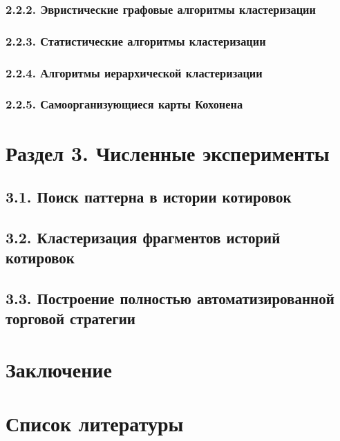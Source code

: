 \documentclass[12pt]{article}
\begin{document}
\subsubsection{2.2.2. Эвристические графовые алгоритмы кластеризации}
\subsubsection{2.2.3. Статистические алгоритмы кластеризации}
\subsubsection{2.2.4. Алгоритмы иерархической кластеризации}
\subsubsection{2.2.5. Самоорганизующиеся карты Кохонена}
\section{Раздел 3. Численные эксперименты}
\subsection{3.1. Поиск паттерна в истории котировок}
\subsection{3.2. Кластеризация фрагментов историй котировок}
\subsection{3.3. Построение полностью автоматизированной торговой стратегии}
\section{Заключение}
\section{Список литературы}
\end{document}
